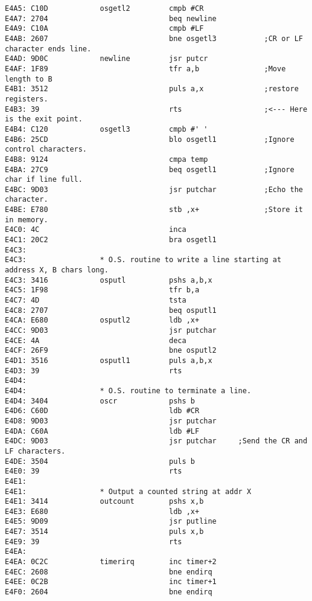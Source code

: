 {\begin{verbatim}
E4A5: C10D            osgetl2         cmpb #CR
E4A7: 2704                            beq newline
E4A9: C10A                            cmpb #LF
E4AB: 2607                            bne osgetl3           ;CR or LF character ends line.
E4AD: 9D0C            newline         jsr putcr             
E4AF: 1F89                            tfr a,b               ;Move length to B
E4B1: 3512                            puls a,x              ;restore registers.
E4B3: 39                              rts                   ;<--- Here is the exit point.
E4B4: C120            osgetl3         cmpb #' '
E4B6: 25CD                            blo osgetl1           ;Ignore control characters.
E4B8: 9124                            cmpa temp
E4BA: 27C9                            beq osgetl1           ;Ignore char if line full.
E4BC: 9D03                            jsr putchar           ;Echo the character.
E4BE: E780                            stb ,x+               ;Store it in memory.
E4C0: 4C                              inca
E4C1: 20C2                            bra osgetl1
E4C3:                  
E4C3:                 * O.S. routine to write a line starting at address X, B chars long.
E4C3: 3416            osputl          pshs a,b,x
E4C5: 1F98                            tfr b,a
E4C7: 4D                              tsta
E4C8: 2707                            beq osputl1
E4CA: E680            osputl2         ldb ,x+
E4CC: 9D03                            jsr putchar
E4CE: 4A                              deca
E4CF: 26F9                            bne osputl2
E4D1: 3516            osputl1         puls a,b,x
E4D3: 39                              rts
E4D4:                 
E4D4:                 * O.S. routine to terminate a line.
E4D4: 3404            oscr            pshs b
E4D6: C60D                            ldb #CR
E4D8: 9D03                            jsr putchar
E4DA: C60A                            ldb #LF
E4DC: 9D03                            jsr putchar     ;Send the CR and LF characters.
E4DE: 3504                            puls b
E4E0: 39                              rts
E4E1:                 
E4E1:                 * Output a counted string at addr X
E4E1: 3414            outcount        pshs x,b
E4E3: E680                            ldb ,x+
E4E5: 9D09                            jsr putline
E4E7: 3514                            puls x,b
E4E9: 39                              rts
E4EA:                 
E4EA: 0C2C            timerirq        inc timer+2
E4EC: 2608                            bne endirq
E4EE: 0C2B                            inc timer+1
E4F0: 2604                            bne endirq

\end{verbatim}}
